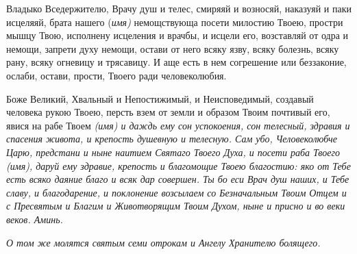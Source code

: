 \mychapterending


\begin{mymulticols}
 


Владыко Вседержителю, Врачу душ и телес, смиряяй и возносяй, наказуяй и паки исцеляяй, брата нашего {(\itshape имя)} немощствующа посети милостию Твоею, простри мышцу Твою, исполнену исцеления и врачбы, и исцели его, возставляй от одра и немощи, запрети духу немощи, остави от него всяку язву, всяку болезнь, всяку рану, всяку огневицу и трясавицу. И аще есть в нем согрешение или беззаконие, ослаби, остави, прости, Твоего ради человеколюбия.




\end{mymulticols}

\mychapterending


\begin{mymulticols}
 


Боже Великий, Хвальный и Непостижимый, и Неисповедимый, создавый человека рукою Твоею, персть взем от земли и образом Твоим почтивый его, явися на рабе Твоем \itshape (имя)\normalfont{}  и даждь ему сон успокоения, сон телесный, здравия и спасения живота, и крепость душевную и телесную. Сам убо, Человеколюбче Царю, предстани и ныне наитием Святаго Твоего Духа, и посети раба Твоего \itshape (имя)\normalfont{}, даруй ему здравие, крепость и благомощие Твоею благостию: яко от Тебе есть всяко даяние благо и всяк дар совершен. Ты бо еси Врач душ наших, и Тебе славу, и благодарение, и поклонение возсылаем со Безначальным Твоим Отцем и с Пресвятым и Благим и Животворящим Твоим Духом, ныне и присно и во веки веков. Аминь. 


\itshape О том же молятся святым семи отрокам и Ангелу Хранителю болящего.\normalfont{}




\end{mymulticols}

\mychapterending


